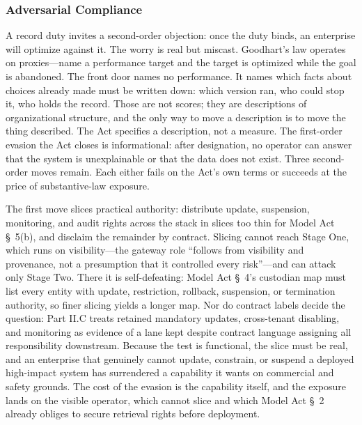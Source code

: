 \subsubsection{Adversarial Compliance}
\label{sec:adversarial-compliance}

A record duty invites a second-order objection: once the duty binds, an enterprise will optimize against it. The worry is real but miscast. Goodhart's law operates on proxies---name a performance target and the target is optimized while the goal is abandoned. The front door names no performance. It names which facts about choices already made must be written down: which version ran, who could stop it, who holds the record. Those are not scores; they are descriptions of organizational structure, and the only way to move a description is to move the thing described. The Act specifies a description, not a measure. The first-order evasion the Act closes is informational: after designation, no operator can answer that the system is unexplainable or that the data does not exist. Three second-order moves remain. Each either fails on the Act's own terms or succeeds at the price of substantive-law exposure.

The first move slices practical authority: distribute update, suspension, monitoring, and audit rights across the stack in slices too thin for Model Act \S~5(b), and disclaim the remainder by contract. Slicing cannot reach Stage One, which runs on visibility---the gateway role ``follows from visibility and provenance, not a presumption that it controlled every risk''---and can attack only Stage Two. There it is self-defeating: Model Act \S~4's custodian map must list every entity with update, restriction, rollback, suspension, or termination authority, so finer slicing yields a longer map. Nor do contract labels decide the question: Part II.C treats retained mandatory updates, cross-tenant disabling, and monitoring as evidence of a lane kept despite contract language assigning all responsibility downstream. Because the test is functional, the slice must be real, and an enterprise that genuinely cannot update, constrain, or suspend a deployed high-impact system has surrendered a capability it wants on commercial and safety grounds. The cost of the evasion is the capability itself, and the exposure lands on the visible operator, which cannot slice and which Model Act \S~2 already obliges to secure retrieval rights before deployment.

